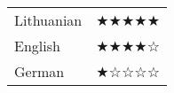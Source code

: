 
\begin{tabular}{l r}
Lithuanian      & ★★★★★ \\
English         & ★★★★☆ \\
German          & ★☆☆☆☆ \\
\end{tabular}
